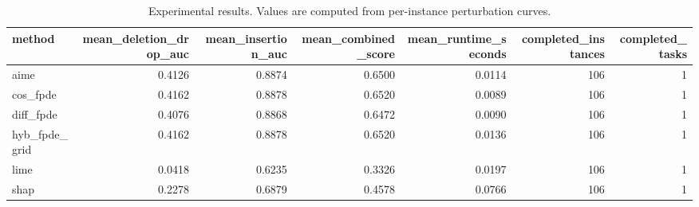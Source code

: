 \begin{table}[t]
\caption{Experimental results. Values are computed from per-instance perturbation curves.}
\label{tab:main_results_computed}
\centering
\begin{tabular}{lrrrrrr}
\toprule
method & mean\_deletion\_drop\_auc & mean\_insertion\_auc & mean\_combined\_score & mean\_runtime\_seconds & completed\_instances & completed\_tasks \\
\midrule
aime & 0.4126 & 0.8874 & 0.6500 & 0.0114 & 106 & 1 \\
cos\_fpde & 0.4162 & 0.8878 & 0.6520 & 0.0089 & 106 & 1 \\
diff\_fpde & 0.4076 & 0.8868 & 0.6472 & 0.0090 & 106 & 1 \\
hyb\_fpde\_grid & 0.4162 & 0.8878 & 0.6520 & 0.0136 & 106 & 1 \\
lime & 0.0418 & 0.6235 & 0.3326 & 0.0197 & 106 & 1 \\
shap & 0.2278 & 0.6879 & 0.4578 & 0.0766 & 106 & 1 \\
\bottomrule
\end{tabular}

\end{table}
